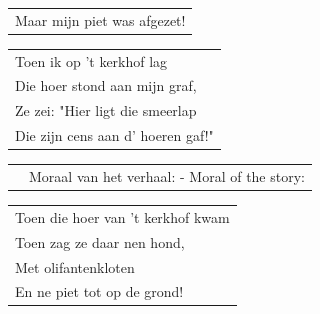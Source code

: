 \documentclass[a4paper, 14pt]{extarticle}
\begin{document}
\begin{flushleft}
\begin{tabularx}{0.8\textwidth} {
   >{\raggedright\arraybackslash}X}
Maar mijn piet was afgezet!\\
\end{tabularx}
\end{flushleft}\begin{flushleft}
\begin{tabularx}{0.8\textwidth} {
   >{\raggedright\arraybackslash}X}Toen ik op ’t kerkhof lag\\
Die hoer stond aan mijn graf,\\
Ze zei: "Hier ligt die smeerlap\\
Die zijn cens aan d’ hoeren gaf!"\\
\end{tabularx}
\end{flushleft}\begin{flushleft}
\begin{tabularx}{0.8\textwidth} {
   c >{\raggedright\arraybackslash}X}
\hspace{5mm} & {\small Moraal van het verhaal: - Moral of the story:}
\end{tabularx}
\end{flushleft}\begin{flushleft}
\begin{tabularx}{0.8\textwidth} {
   >{\raggedright\arraybackslash}X}
Toen die hoer van ’t kerkhof kwam\\
Toen zag ze daar nen hond,\\
Met olifantenkloten\\
En ne piet tot op de grond!\\
\end{tabularx}
\end{flushleft}
\newpage
\end{document}
